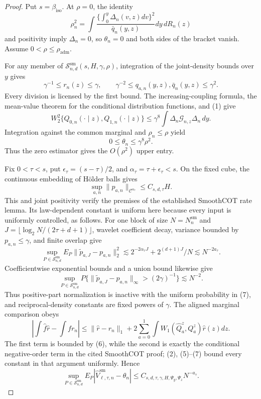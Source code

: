 \documentclass{article}
\begin{document}
\begin{proof}
Put \(s=\beta_{\mathrm{iso}}\).  At \(\rho=0\), the identity
\[
\rho_n^2=\int\frac{\{\int_0^y\Delta_n(v,z)dv\}^2}{\bar q_n(y,z)}dy\,dR_n(z) \tag{1}
\]
and positivity imply \(\Delta_n=0\), so \(\theta_n=0\) and both sides of the bracket vanish.  Assume \(0<\rho\le\rho_{\mathrm{adm}}\).

For any member of \(\mathcal S^{\mathrm{sm}}_{n,d}(s,H,\gamma,\rho)\), integration of the joint-density bounds over \(y\) gives
\[
\gamma^{-1}\le r_n(z)\le\gamma,
\qquad
\gamma^{-2}\le q_{a,n}(y,z),\bar q_n(y,z)\le\gamma^2. \tag{2}
\]
Every division is licensed by the first bound.  The increasing-coupling formula, the mean-value theorem for the conditional distribution functions, and (1) give
\[
W_2^2\{Q_{0,n}(\cdot\mid z),Q_{1,n}(\cdot\mid z)\}
\le\gamma^8\int\Delta_n\mathcal G_{n,z}\Delta_n\,dy. \tag{3}
\]
Integration against the common marginal and \(\rho_n\le\rho\) yield
\[
0\le\theta_n\le\gamma^8\rho^2. \tag{4}
\]
Thus the zero estimator gives the \(O(\rho^2)\) upper entry.

Fix \(0<\tau<s\), put \(\epsilon_\tau=(s-\tau)/2\), and \(\alpha_\tau=\tau+\epsilon_\tau<s\).  On the fixed cube, the continuous embedding of H\"older balls gives
\[
\sup_{a,n}\|p_{a,n}\|_{\mathcal C^{\alpha_\tau}}
\le C_{s,d,\tau}H. \tag{5}
\]
This and joint positivity verify the premises of the established SmoothCOT rate lemma.  Its law-dependent constant is uniform here because every input is uniformly controlled, as follows.  For one block of size \(N=N_n^{\mathrm{sm}}\) and \(J=\lfloor\log_2N/(2\tau+d+1)\rfloor\), wavelet coefficient decay, variance bounded by \(p_{a,n}\le\gamma\), and finite overlap give
\[
\sup_{P\in\mathcal S^{\mathrm{sm}}_{n,d}}
E_P\|\widetilde p_{a,J}-p_{a,n}\|_2^2
\lesssim2^{-2\alpha_\tau J}+2^{(d+1)J}/N
\lesssim N^{-2a_\tau}. \tag{6}
\]
Coefficientwise exponential bounds and a union bound likewise give
\[
\sup_{P\in\mathcal S^{\mathrm{sm}}_{n,d}}
P\{\|\widetilde p_{a,J}-p_{a,n}\|_\infty>(2\gamma)^{-1}\}
\lesssim N^{-2}. \tag{7}
\]
Thus positive-part normalization is inactive with the uniform probability in (7), and reciprocal-density constants are fixed powers of \(\gamma\).  The aligned marginal comparison obeys
\[
\left|\int\widehat f\widehat r-\int fr_n\right|
\le\|\widehat r-r_n\|_1
+2\sum_{a=0}^1\int W_1(\widehat Q_a^z,Q_a^z)\widehat r(z)dz. \tag{8}
\]
The first term is bounded by (6), while the second is exactly the conditional negative-order term in the cited SmoothCOT proof; (2), (5)--(7) bound every constant in that argument uniformly.  Hence
\[
\sup_{P\in\mathcal S^{\mathrm{sm}}_{n,d}}
E_P|\widehat V_{\ell,\tau,n}^{\mathrm{sm}}-\theta_n|
\le C_{s,d,\tau,\gamma,H,\Psi_y,\Psi_z}N^{-a_\tau}. \tag{9}
\]


\end{proof}
\end{document}
